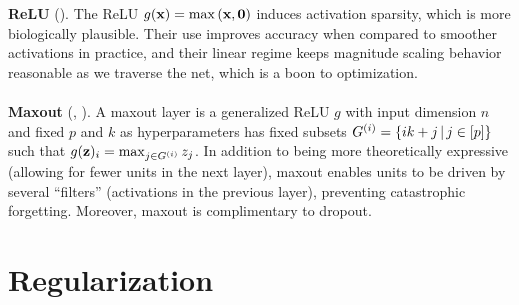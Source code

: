 \documentclass{article}
\begin{document}
\textbf{ReLU} (). The ReLU $g(\textbf{x})=\max\left({\textbf{x},\textbf{0}}\right)$ induces activation sparsity, which is more biologically plausible. Their use improves accuracy when compared to smoother activations in practice, and their linear regime keeps magnitude scaling behavior reasonable as we traverse the net, which is a boon to optimization.
\\\\
\noindent
\textbf{Maxout} (, ). A maxout layer is a generalized ReLU $g$ with input dimension $n$ and fixed $p$ and $k$ as hyperparameters has fixed subsets $G^{(i)}=\left\{ ik+j \,\middle|\, j\in[p] \right\}$ such that $g(\textbf{z})_i=\max_{j\in G^{(i)}}z_j$. In addition to being more theoretically expressive (allowing for fewer units in the next layer), maxout enables units to be driven by several ``filters'' (activations in the previous layer), preventing catastrophic forgetting. Moreover, maxout is complimentary to dropout.

\section{Regularization}
\end{document}
